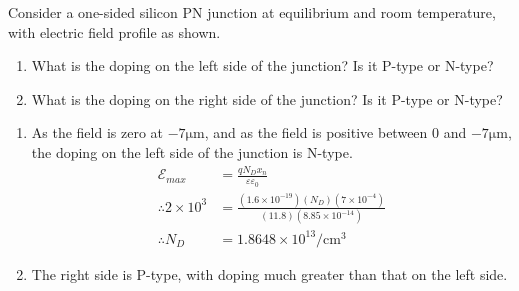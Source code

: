 \documentclass[fleqn, a4paper, 11pt, oneside]{amsart}
\theoremstyle{definition}
\theoremstyle{theorem}
\begin{document}
\begin{question}
	Consider a one-sided silicon PN junction at equilibrium and room temperature, with electric field profile as shown.
	\begin{figure}[H]
		\centering
	\end{figure}
	\begin{enumerate}
		\item
			What is the doping on the left side of the junction?
			Is it P-type or N-type?
		\item
			What is the doping on the right side of the junction?
			Is it P-type or N-type?
	\end{enumerate}
\end{question}

\begin{solution}
	\begin{enumerate}[leftmargin=*]
		\item
			As the field is zero at $-7 \si{\micro\metre}$, and as the field is positive between $0$ and $-7 \si{\micro\metre}$, the doping on the left side of the junction is N-type.
			\begin{align*}
				\mathcal{E}_{max}          & = \frac{q N_D x_n}{\varepsilon \varepsilon_0}                                                                                 \\
				\therefore 2 \times 10^{3} & = \frac{\left( 1.6 \times 10^{-19} \right) (N_D) \left( 7 \times 10^{-4} \right)}{(11.8) \left( 8.85 \times 10^{-14} \right)} \\
				\therefore N_D             & = 1.8648 \times 10^{13} \si{\per\centi\metre\cubed}
			\end{align*}
		\item
			The right side is P-type, with doping much greater than that on the left side.
	\end{enumerate}
\end{solution}
\end{document}
